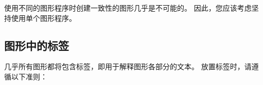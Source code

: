 使用不同的图形程序时创建一致性的图形几乎是不可能的。 因此，您应该考虑坚持使用单个图形程序。


\subsection{图形中的标签}


几乎所有图形都将包含标签，即用于解释图形各部分的文本。 放置标签时，请遵循以下准则：

